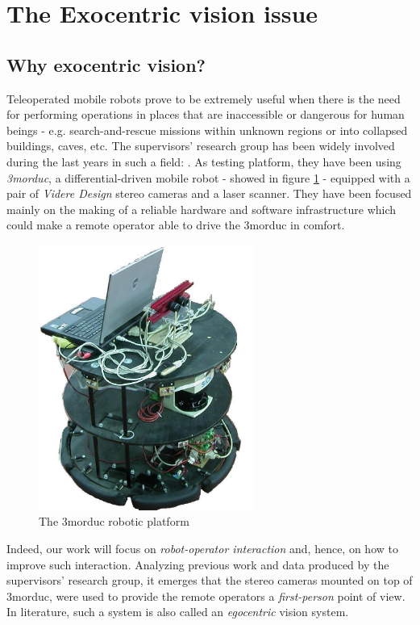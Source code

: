 \section{The Exocentric vision issue}
\label{sec:exo}
\subsection{Why exocentric vision?}
Teleoperated mobile robots prove to be extremely useful 
when there is the need for performing operations in places that 
are inaccessible or dangerous for human beings - e.g. 
search-and-rescue missions within unknown regions or into 
collapsed buildings, caves, etc.
%
The supervisors' research group has been widely involved 
during the last years in such a field: \cite{livatino2010}.
%
As testing platform, they have been using \textit{3morduc},
a differential-driven mobile robot - showed in figure \ref{fig:3morduc} -
equipped with a pair of \textit{Videre Design} \cite{videredesign} 
stereo cameras and a laser scanner. They have been focused 
mainly on the making of a reliable hardware and software 
infrastructure which could make a remote operator able to drive 
the 3morduc in comfort.
%
\begin{figure}[!h]
  \begin{center}
    \includegraphics[width=200pt]{img/3morduc.jpg}  %
    \caption{The 3morduc robotic platform}
    \label{fig:3morduc}
  \end{center}
\end{figure}
%
Indeed, our work will focus on \textit{robot-operator interaction} and, 
hence, on how to improve such interaction. 
%
Analyzing previous work and data produced by the supervisors' 
research group, it emerges that the stereo cameras mounted on 
top of 3morduc, were used to provide the remote operators a 
\textit{first-person} point of view. In literature, such a 
system is also called an \textit{egocentric} vision system.
%

